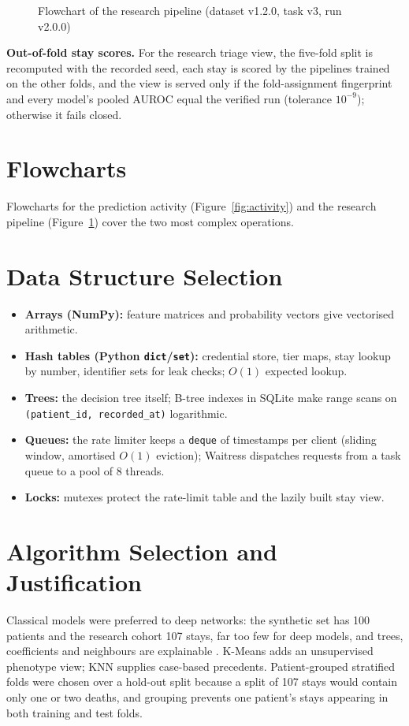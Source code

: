 \begin{figure}[!htbp]
\centering
{}
\caption{Flowchart of the research pipeline (dataset v1.2.0, task v3, run v2.0.0)}
\label{fig:pipeline}
\end{figure}

\textbf{Out-of-fold stay scores.} For the research triage view, the five-fold split is recomputed with the
recorded seed, each stay is scored by the pipelines trained on the other folds, and the view is served only
if the fold-assignment fingerprint and every model's pooled AUROC equal the verified run (tolerance
$10^{-9}$); otherwise it fails closed.

\section{Flowcharts}
Flowcharts for the prediction activity (Figure~\ref{fig:activity}) and the research pipeline
(Figure~\ref{fig:pipeline}) cover the two most complex operations.

\section{Data Structure Selection}
\begin{itemize}
\item \textbf{Arrays (NumPy):} feature matrices and probability vectors give vectorised arithmetic.
\item \textbf{Hash tables (Python \texttt{dict}/\texttt{set}):} credential store, tier maps, stay lookup by
      number, identifier sets for leak checks; $O(1)$ expected lookup.
\item \textbf{Trees:} the decision tree itself; B-tree indexes in SQLite make range scans on
      \texttt{(patient\_id, recorded\_at)} logarithmic.
\item \textbf{Queues:} the rate limiter keeps a \texttt{deque} of timestamps per client (sliding window,
      amortised $O(1)$ eviction); Waitress dispatches requests from a task queue to a pool of 8 threads.
\item \textbf{Locks:} mutexes protect the rate-limit table and the lazily built stay view.
\end{itemize}

\section{Algorithm Selection and Justification}
Classical models were preferred to deep networks: the synthetic set has 100 patients and the research
cohort 107 stays, far too few for deep models, and trees, coefficients and neighbours are explainable
\cite{rudin2019stop}. K-Means adds an unsupervised phenotype view; KNN supplies case-based precedents.
Patient-grouped stratified folds were chosen over a hold-out split because a split of 107 stays would
contain only one or two deaths, and grouping prevents one patient's stays appearing in both training and
test folds.

